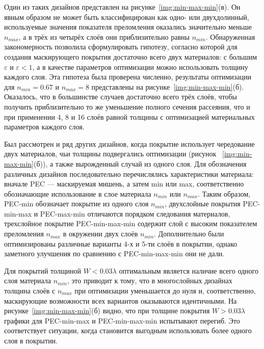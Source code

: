 Один из таких дизайнов представлен на
рисунке~\ref{img:min-max-min}(в). Он явным образом не может быть
классифицирован как одно- или двухдолинный, используемые значения
показателя преломления оказались значительно меньше $n_{max}$, а в
трёх из четырёх слоёв они приблизительно равны $n_{min}$.
Обнаруженная закономерность позволила сформулировать гипотезу,
согласно которой для создания маскирующего покрытия достаточно
всего двух материалов: с большим $\varepsilon$ и
${\varepsilon<1}$, а в качестве параметров оптимизации можно
использовать толщину каждого слоя. Эта гипотеза была проверена
численно, результаты оптимизации для $n_{min}=0.67$ и $n_{max}=8$
представлены на рисунке~\ref{img:min-max-min}(б). Оказалось, что в
большинстве случаев достаточно всего трёх слоёв, чтобы получить приблизительно то же
уменьшение полного сечения рассеяния, что и при применении 4, 8 и
16 слоёв равной толщины с оптимизацией материальных параметров каждого
слоя.

Был рассмотрен и ряд других дизайнов, когда покрытие использует
чередование двух материалов, чьи толщины подвергались оптимизации
(рисунок ~\ref{img:min-max-min}(б)), а также вырожденный случай
из одного слоя.  Для обозначения различных
дизайнов последовательно перечислялись характеристики материала:
вначале PEC --- маскируемая мишень, а затем min или max,
соответственно обозначающие использование в слое материала $n_{min}$
или $n_{max}$. Таким образом, PEC-min обозначает покрытие из одного
слоя $n_{min}$, двухслойные покрытия PEC-min-max и PEC-max-min
отличаются порядком следования материалов, трехслойное покрытие
PEC-min-max-min содержит слой с высоким показателем преломления
$n_{max}$ в окружении двух слоёв $n_{min}$. Дополнительно были
оптимизированы различные варианты 4-х и 5-ти слоёв в покрытии, однако
заметного улучшения по сравнению с PEC-min-max-min они не дали.

Для покрытий толщиной $W<0.03\lambda$ оптимальным является наличие
всего одного слоя материала $n_{min}$, это приводит к тому, что в
многослойных дизайнах толщина слоёв с $n_{max}$ при оптимизации
уменьшается до нуля и, соответственно, маскирующие возможности всех
вариантов оказываются идентичными. На
рисунке~\ref{img:min-max-min}(б) видно, что при толщине покрытия
$W>0.03\lambda$ графики для PEC-min-max и PEC-min-max-min испытывают
перегиб. Это соответствует ситуации, когда становится выгодным
использовать более одного слоя в покрытии.

